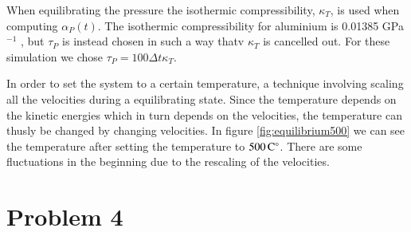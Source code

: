 When equilibrating the pressure the isothermic compressibility, $\kappa_T$, is used when computing $\alpha_P(t)$. The isothermic compressibility for aluminium is 0.01385 GPa$^{-1}$ \cite{knowledgedoor}, but $\tau_P$ is instead chosen in such a way thatv $\kappa_T$ is cancelled out. For these simulation we chose $\tau_P = 100\Delta t \kappa_T$.


In order to set the system to a certain temperature, a technique involving scaling all the velocities during a equilibrating state. Since the temperature depends on the kinetic energies which in turn depends on the velocities, the  temperature can thusly be changed by changing velocities. In figure \ref{fig:equilibrium500} we can see the temperature after setting the temperature to $\unit[500]{C^\circ}$. There are some fluctuations in the beginning due to the rescaling of the velocities.


\section*{Problem 4}

